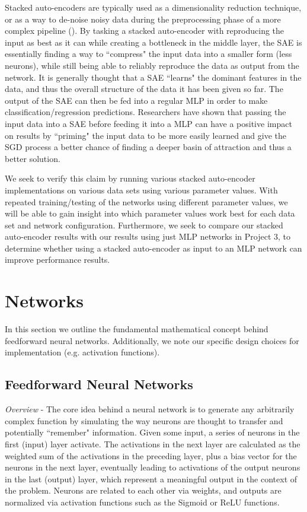 \documentclass[twoside,11pt]{article}
\begin{document}
Stacked auto-encoders are typically used as a dimensionality reduction technique, or as a way to de-noise noisy data during the preprocessing phase of a more complex pipeline (\cite{vincent2010stacked}). By tasking a stacked auto-encoder with reproducing the input as best as it can while creating a bottleneck in the middle layer, the SAE is essentially finding a way to ``compress" the input data into a smaller form (less neurons), while still being able to reliably reproduce the data as output from the network. It is generally thought that a SAE ``learns" the dominant features in the data, and thus the overall structure of the data it has been given so far. The output of the SAE can then be fed into a regular MLP in order to make classification/regression predictions. Researchers have shown that passing the input data into a SAE before feeding it into a MLP can have a positive impact on results by ``priming" the input data to be more easily learned and give the SGD process a better chance of finding a deeper basin of attraction and thus a better solution.

We seek to verify this claim by running various stacked auto-encoder implementations on various data sets using various parameter values. With repeated training/testing of the networks using different parameter values, we will be able to gain insight into which parameter values work best for each data set and network configuration. Furthermore, we seek to compare our stacked auto-encoder results with our results using just MLP networks in Project 3, to determine whether using a stacked auto-encoder as input to an MLP network can improve performance results.

\section{Networks}

In this section we outline the fundamental mathematical concept behind feedforward neural networks. Additionally, we note our specific design choices for implementation (e.g. activation functions).

\subsection{Feedforward Neural Networks}
\textit{Overview} - The core idea behind a neural network is to generate any arbitrarily complex function by simulating the way neurons are thought to transfer and potentially ``remember" information. Given some input, a series of neurons in the first (input) layer activate. The activations in the next layer are calculated as the weighted sum of the activations in the preceding layer, plus a bias vector for the neurons in the next layer, eventually leading to activations of the output neurons in the last (output) layer, which represent a meaningful output in the context of the problem. Neurons are related to each other via weights, and outputs are normalized via activation functions such as the Sigmoid or ReLU functions.
\end{document}
